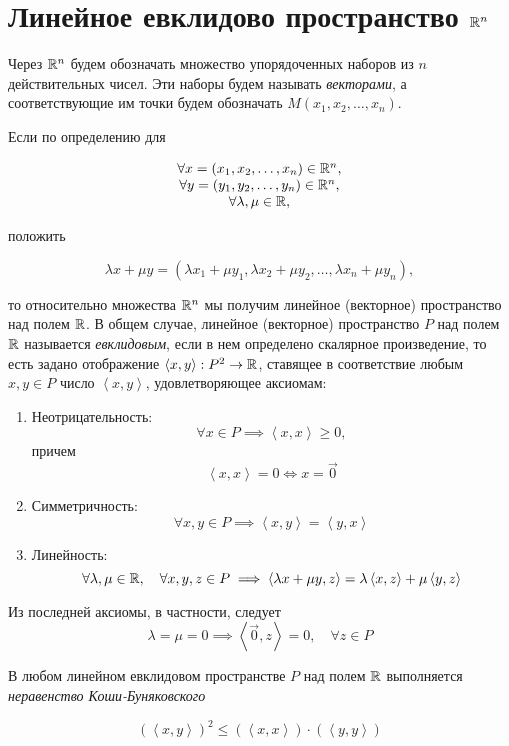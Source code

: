 \documentclass[../../main.tex]{subfiles}
\begin{document}
\section{Линейное евклидово пространство $\mathbb{R}^n$}

Через $\mathbb{R}^n$ будем обозначать множество упорядоченных наборов из $n$
действительных чисел. Эти наборы будем называть \emph{векторами},
а соответствующие им точки будем обозначать $M(x_1, x_2, \dots, x_n)$.

Если по определению для

\[
\begin{array}{c}
 \forall x = (x_1, x_2, \dots, x_n) \in \mathbb{R}^n, \\
 \forall y = (y_1, y_2, \dots, y_n) \in \mathbb{R}^n, \\
 \forall \lambda, \mu \in \mathbb{R},
\end{array}
\]

положить

\[\lambda x + \mu y = (\lambda x_1 + \mu y_1, \lambda x_2 + \mu y_2, 
\dots, \lambda x_n + \mu y_n),\]

то относительно множества $\mathbb{R}^n$ мы получим линейное (векторное) 
пространство над полем $\mathbb{R}$. В общем случае, линейное (векторное) 
пространство $P$ над полем $\mathbb{R}$ называется \emph{евклидовым},
если в нем определено скалярное произведение, то есть  
задано отображение $\left<x, y\right>: P^2 \to \mathbb{R}$, 
ставящее в соответствие любым $x, y \in P$ число 
$\left<x, y\right>$, удовлетворяющее аксиомам:

\begin{enumerate}
 \item Неотрицательность:
 \[\forall x \in P \implies \left<x, x\right> \ge 0,\]
 причем
 \[\left<x, x\right> = 0 \iff x = \vec 0\]
 \item Симметричность:
 \[\forall x, y \in P \implies \left<x, y\right> = \left<y, x\right>\]
 \item Линейность:
 \[\forall \lambda, \mu \in \mathbb{R}, \quad \forall x, y, z \in P \implies
 \left<\lambda x + \mu y, z\right> = \lambda\left<x, z\right> + 
 \mu\left<y, z\right>\]
\end{enumerate}

Из последней аксиомы, в частности, следует \[ \lambda = \mu = 0
\implies \left<\vec{0}, z\right> = 0, \quad \forall z \in P\]

\begin{thm}
 В любом линейном евклидовом пространстве $P$ над полем $\mathbb{R}$
 выполняется \emph{неравенство Коши-Буняковского}
 
 \begin{equation}
  \label{kosh-bun}
  (\left<x, y\right>)^2 \leq \left(\left<x, x\right>\right) 
  \cdot \left(\left<y, y\right>\right)
 \end{equation}
\end{thm}
\end{document}
